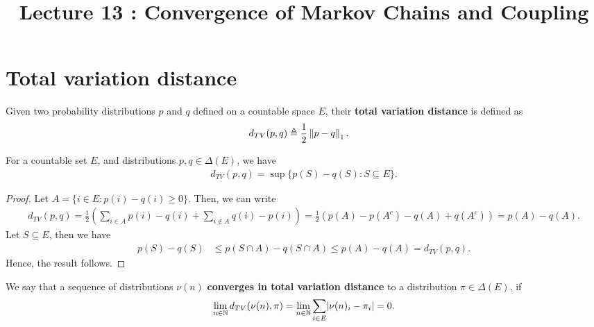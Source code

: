 \documentclass[a4paper,10pt,english]{article}
\title{Lecture 13 : Convergence of Markov Chains and Coupling} %
\author{}
\begin{document}
\maketitle

\section{Total variation distance}
Given two probability distributions $p$ and $q$ defined on a countable space $E$, their \textbf{total variation distance} is defined as
\begin{align*}
d_{TV}(p,q) &\triangleq \dfrac{1}{2}\left\lVert p-q\right\rVert_1.
\end{align*}
\begin{lem} For a countable set $E$, and distributions $p, q \in \Delta(E)$, we have 
\begin{align*}
d_{TV}(p,q) = \sup\{ p(S) - q(S) : S \subseteq E \}.
\end{align*}
\end{lem}
\begin{proof} 
Let $A = \{ i \in E : p(i) - q(i) \geq 0 \}$. 
Then, we can write
\begin{align*}
d_{TV}(p,q) = \frac{1}{2}\left(\sum_{i \in A}p(i) - q(i) + \sum_{i \notin A} q(i) - p(i) \right)= \frac{1}{2}\left(p(A) - p(A^c) - q(A) + q(A^c) \right) = p(A)-q(A).
\end{align*}
Let $S \subseteq E$, then we have
\begin{align*}
p(S)-q(S) &\leq p(S\cap A) - q(S \cap A) \leq p(A) - q(A) = d_{TV}(p,q).
\end{align*}
Hence, the result follows.
\end{proof}
We say that a sequence of distributions %
$\nu(n)$ \textbf{converges in total variation distance} to a distribution $\pi \in \Delta(E)$, 
if %
\begin{align*}
\lim_{n \in \mathbb{N}} d_{TV}(\nu(n), \pi) = \lim_{n \in \mathbb{N}} \sum_{i \in E} \lvert\nu(n)_i - \pi_i\rvert = 0.
\end{align*} 
\end{document}
